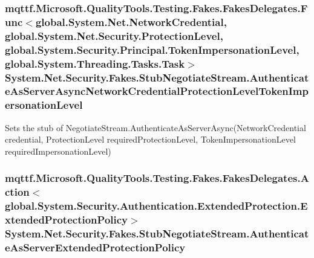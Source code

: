 \hypertarget{class_system_1_1_net_1_1_security_1_1_fakes_1_1_stub_negotiate_stream_aa87ac74a9dce315c04d238fa1fbb4daa}{
\subsubsection[{Authenticate\-As\-Server\-Async\-Network\-Credential\-Protection\-Level\-Token\-Impersonation\-Level}]{\setlength{\rightskip}{0pt plus 5cm}mqttf.\-Microsoft.\-Quality\-Tools.\-Testing.\-Fakes.\-Fakes\-Delegates.\-Func$<$global.\-System.\-Net.\-Network\-Credential, global.\-System.\-Net.\-Security.\-Protection\-Level, global.\-System.\-Security.\-Principal.\-Token\-Impersonation\-Level, global.\-System.\-Threading.\-Tasks.\-Task$>$ System.\-Net.\-Security.\-Fakes.\-Stub\-Negotiate\-Stream.\-Authenticate\-As\-Server\-Async\-Network\-Credential\-Protection\-Level\-Token\-Impersonation\-Level}}\label{class_system_1_1_net_1_1_security_1_1_fakes_1_1_stub_negotiate_stream_aa87ac74a9dce315c04d238fa1fbb4daa}


Sets the stub of Negotiate\-Stream.\-Authenticate\-As\-Server\-Async(\-Network\-Credential credential, Protection\-Level required\-Protection\-Level, Token\-Impersonation\-Level required\-Impersonation\-Level)

\hypertarget{class_system_1_1_net_1_1_security_1_1_fakes_1_1_stub_negotiate_stream_a116a325257f3bc6f3f1ba91d0395e75b}{
\subsubsection[{Authenticate\-As\-Server\-Extended\-Protection\-Policy}]{\setlength{\rightskip}{0pt plus 5cm}mqttf.\-Microsoft.\-Quality\-Tools.\-Testing.\-Fakes.\-Fakes\-Delegates.\-Action$<$global.\-System.\-Security.\-Authentication.\-Extended\-Protection.\-Extended\-Protection\-Policy$>$ System.\-Net.\-Security.\-Fakes.\-Stub\-Negotiate\-Stream.\-Authenticate\-As\-Server\-Extended\-Protection\-Policy}}\label{class_system_1_1_net_1_1_security_1_1_fakes_1_1_stub_negotiate_stream_a116a325257f3bc6f3f1ba91d0395e75b}


